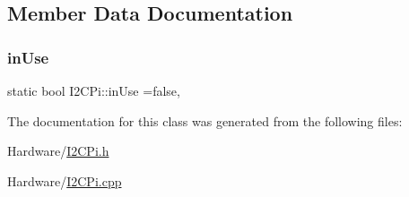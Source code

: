 \subsection{Member Data Documentation}
\mbox{\label{class_i2_c_pi_a0bc9e6da78c59931828f30744527ff6c}} 
\subsubsection{\texorpdfstring{in\+Use}{inUse}}
{\footnotesize\ttfamily static bool I2\+C\+Pi\+::in\+Use =false\hspace{0.3cm}{\ttfamily [static]}, {\ttfamily [private]}}



The documentation for this class was generated from the following files\+:\begin{DoxyCompactItemize}
\item 
Hardware/\mbox{\hyperlink{_i2_c_pi_8h}{I2\+C\+Pi.\+h}}\item 
Hardware/\mbox{\hyperlink{_i2_c_pi_8cpp}{I2\+C\+Pi.\+cpp}}\end{DoxyCompactItemize}
